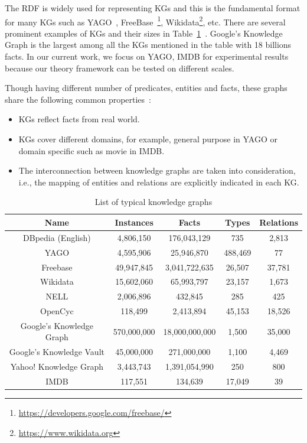 The RDF is widely used for representing KGs and this is the fundamental format for many KGs such as YAGO~\cite{ref28}, FreeBase~\footnote{\url{https://developers.google.com/freebase/}}, Wikidata\footnote{\url{https://www.wikidata.org}}, etc. There are several prominent examples of KGs and their sizes in Table~\ref{table1}~\cite{ref27}. Google's Knowledge Graph is the largest among all the KGs mentioned in the table with 18 billions facts. In our current work, we focus on YAGO, IMDB for experimental results because our theory framework can be tested on different scales.

Though having different number of predicates, entities and facts, these graphs share the following common properties~\cite{ref27}:

\begin{itemize}
\item KGs reflect facts from real world.
\item KGs cover different domains, for example, general purpose in YAGO or domain specific such as movie in IMDB.
\item The interconnection between knowledge graphs are taken into consideration, i.e., the mapping of entities and relations are explicitly indicated in each KG.
\end{itemize}

\begin{table}
\begin{center}
\begin{tabular}{|c|c|c|c|c|}
\hline
Name & Instances & Facts & Types & Relations\\
\hline\hline
DBpedia (English) & 4,806,150 & 176,043,129 & 735 & 2,813\\
\hline
YAGO & 4,595,906 & 25,946,870 & 488,469 & 77\\
\hline
Freebase & 49,947,845 & 3,041,722,635 & 26,507 & 37,781\\
\hline
Wikidata & 15,602,060 & 65,993,797 & 23,157 & 1,673\\
\hline
NELL & 2,006,896 & 432,845 & 285 & 425\\
\hline
OpenCyc & 118,499 & 2,413,894 & 45,153 & 18,526\\
\hline
Google's Knowledge Graph & 570,000,000 & 18,000,000,000 & 1,500 & 35,000\\
\hline
Google's Knowledge Vault & 45,000,000 & 271,000,000 & 1,100 & 4,469\\
\hline
Yahoo! Knowledge Graph & 3,443,743 & 1,391,054,990 & 250 & 800\\
\hline
IMDB & 117,551 & 134,639 & 17,049 & 39 \\
\hline
\end{tabular}
\end{center}
\caption{List of typical knowledge graphs}
\label{table1}
\end{table}

